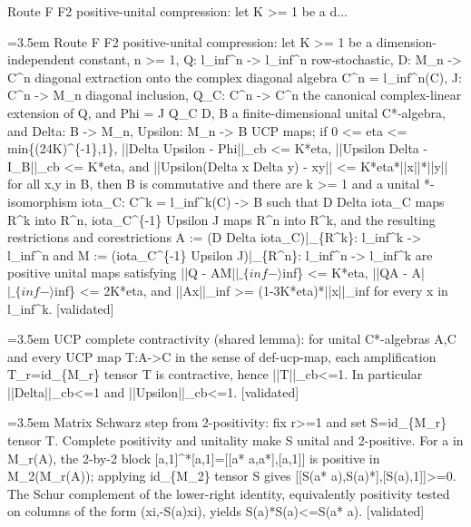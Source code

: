 \documentclass{article}
\newcommand{\step}[1]{\par\noindent\hangindent=3.5em\hangafter=1%
  \makebox[3.5em][l]{\textbf{#1.}}}
\newcommand{\steptag}[1]{\hfill{\small\textsf{[#1]}}}
\begin{document}
\begin{proofbox}{Route F F2 positive-unital compression: let K >= 1 be a d...}
\step{1} Route F F2 positive-unital compression: let K >= 1 be a dimension-independent constant, n >= 1, Q: l\_inf\textasciicircum{}n -> l\_inf\textasciicircum{}n row-stochastic, D: M\_n -> C\textasciicircum{}n diagonal extraction onto the complex diagonal algebra C\textasciicircum{}n = l\_inf\textasciicircum{}n(C), J: C\textasciicircum{}n -> M\_n diagonal inclusion, Q\_C: C\textasciicircum{}n -> C\textasciicircum{}n the canonical complex-linear extension of Q, and Phi = J Q\_C D, B a finite-dimensional unital C*-algebra, and Delta: B -> M\_n, Upsilon: M\_n -> B UCP maps; if 0 <= eta <= min\{(24K)\textasciicircum{}\{-1\},1\}, ||Delta Upsilon - Phi||\_cb <= K*eta, ||Upsilon Delta - I\_B||\_cb <= K*eta, and ||Upsilon(Delta x Delta y) - xy|| <= K*eta*||x||*||y|| for all x,y in B, then B is commutative and there are k >= 1 and a unital *-isomorphism iota\_C: C\textasciicircum{}k = l\_inf\textasciicircum{}k(C) -> B such that D Delta iota\_C maps R\textasciicircum{}k into R\textasciicircum{}n, iota\_C\textasciicircum{}\{-1\} Upsilon J maps R\textasciicircum{}n into R\textasciicircum{}k, and the resulting restrictions and corestrictions A := (D Delta iota\_C)|\_\{R\textasciicircum{}k\}: l\_inf\textasciicircum{}k -> l\_inf\textasciicircum{}n and M := (iota\_C\textasciicircum{}\{-1\} Upsilon J)|\_\{R\textasciicircum{}n\}: l\_inf\textasciicircum{}n -> l\_inf\textasciicircum{}k are positive unital maps satisfying ||Q - AM|$|\_\{inf-\rangle$inf\} <= K*eta, ||QA - A|$|\_\{inf-\rangle$inf\} <= 2K*eta, and ||Ax||\_inf >= (1-3K*eta)*||x||\_inf for every x in l\_inf\textasciicircum{}k. \steptag{validated} \\[6pt]
\step{1.1} UCP complete contractivity (shared lemma): for unital C*-algebras A,C and every UCP map T:A->C in the sense of def-ucp-map, each amplification T\_r=id\_\{M\_r\} tensor T is contractive, hence ||T||\_cb<=1. In particular ||Delta||\_cb<=1 and ||Upsilon||\_cb<=1. \steptag{validated} \\[6pt]
\step{1.1.1} Matrix Schwarz step from 2-positivity: fix r>=1 and set S=id\_\{M\_r\} tensor T. Complete positivity and unitality make S unital and 2-positive. For a in M\_r(A), the 2-by-2 block [a,1]\textasciicircum{}*[a,1]=[[a* a,a*],[a,1]] is positive in M\_2(M\_r(A)); applying id\_\{M\_2\} tensor S gives [[S(a* a),S(a)*],[S(a),1]]>=0. The Schur complement of the lower-right identity, equivalently positivity tested on columns of the form (xi,-S(a)xi), yields S(a)*S(a)<=S(a* a). \steptag{validated} \\[4pt]

\end{proofbox}
\end{document}
